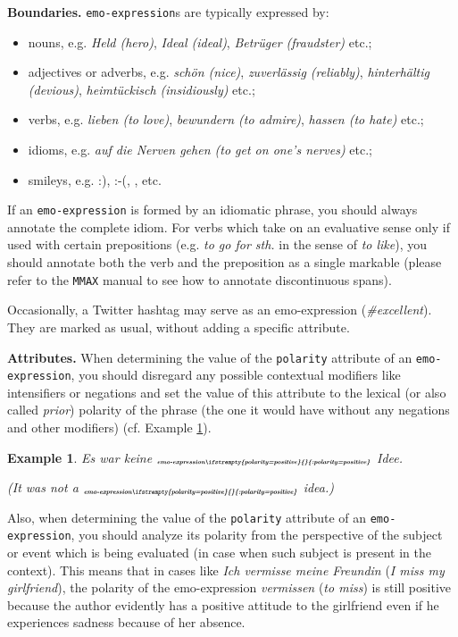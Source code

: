 \documentclass[11pt,a4paper]{article}
\theoremstyle{mytheoremstyle}
\newtheorem{exmp}{Example}[section]
\newcommand{\mtag}[2]{{\upshape[\emph{#2}\upshape]$_{\textrm{\bfseries\emph{\tiny
        #1}}}$}}
\newcommand{\emoexpression}[2][]{\mtag{emo-\-ex\-pression\ifstrempty{#1}{}{:#1}}{#2}}
\begin{document}
\noindent\textbf{Boundaries.} \texttt{emo-expression}s are typically
expressed by:
\begin{itemize}
  \item nouns, e.g. \textit{Held (hero)}, \textit{Ideal (ideal)},
    \textit{Betr\"uger (fraudster)} etc.;

  \item adjectives or adverbs, e.g. \textit{sch\"on (nice)},
    \textit{zuverl\"assig (reliably)}, \textit{hinterh\"altig
      (devious)}, \textit{heimt\"uckisch (insidiously)} etc.;

  \item verbs, e.g. \textit{lieben (to love)}, \textit{bewundern (to
    admire)}, \textit{hassen (to hate)} etc.;

  \item idioms, e.g. \textit{auf die Nerven gehen (to get on one's
    nerves)} etc.;

  \item smileys, e.g. :), :-(, \smiley{}, \frownie{} etc.
\end{itemize}
If an \texttt{emo-expression} is formed by an idiomatic phrase, you should
always annotate the complete idiom.  For verbs which take on an evaluative
sense only if used with certain prepositions (e.g. \textit{to go for sth.} in
the sense of \textit{to like}), you should annotate both the verb and the
preposition as a single markable (please refer to the \texttt{MMAX} manual to
see how to annotate discontinuous spans).

Occasionally, a Twitter hashtag may serve as an emo-expression
(\emph{\#excellent}).  They are marked as usual, without adding a
specific attribute.

\noindent\textbf{Attributes.} When determining the value of the
\texttt{polarity} attribute of an \texttt{emo-expression}, you should
disregard any possible contextual modifiers like intensifiers or
negations and set the value of this attribute to the lexical (or also
called \emph{prior}) polarity of the phrase (the one it would have
without any negations and other modifiers) (cf. Example
\ref{exmp:emo-expression-polarity}).
\begin{exmp}
Es war keine \emoexpression[polarity=positive]{gute} Idee.

(It was not a \emoexpression[polarity=positive]{good} idea.)\label{exmp:emo-expression-polarity}
\end{exmp}

Also, when determining the value of the \texttt{polarity} attribute of
an \texttt{emo-expression}, you should analyze its polarity from the
perspective of the subject or event which is being evaluated (in case
when such subject is present in the context).  This means that in
cases like \textit{Ich vermisse meine Freundin} (\textit{I miss my
  girlfriend}), the polarity of the emo-expression \textit{vermissen}
(\textit{to miss}) is still positive because the author evidently has
a positive attitude to the girlfriend even if he experiences sadness
because of her absence.
\end{document}
